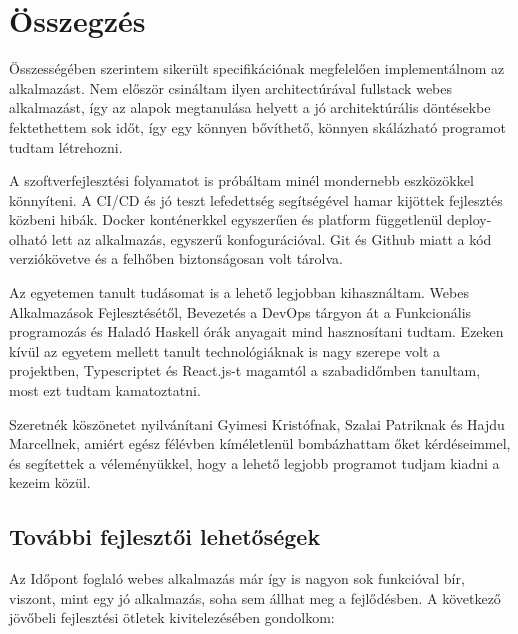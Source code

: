 \chapter{Összegzés} %
\label{ch:sum}

Összességében szerintem sikerült specifikációnak megfelelően implementálnom az alkalmazást. Nem először csináltam ilyen architectúrával fullstack webes alkalmazást, így az alapok megtanulása helyett a jó architektúrális döntésekbe fektethettem sok időt, így egy könnyen bővíthető, könnyen skálázható programot tudtam létrehozni.

A szoftverfejlesztési folyamatot is próbáltam minél mondernebb eszközökkel könnyíteni. A CI/CD és jó teszt lefedettség segítségével hamar kijöttek fejlesztés közbeni hibák. Docker konténerkkel egyszerűen és platform függetlenül deploy-olható lett az alkalmazás, egyszerű konfogurációval. Git és Github miatt a kód verziókövetve és a felhőben biztonságosan volt tárolva.

Az egyetemen tanult tudásomat is a lehető legjobban kihasználtam. Webes Alkalmazások Fejlesztésétől, Bevezetés a DevOps tárgyon át a Funkcionális programozás és Haladó Haskell órák anyagait mind hasznosítani tudtam. Ezeken kívül az egyetem mellett tanult technológiáknak is nagy szerepe volt a projektben, Typescriptet és React.js-t magamtól a szabadidőmben tanultam, most ezt tudtam kamatoztatni.

Szeretnék köszönetet nyilvánítani Gyimesi Kristófnak, Szalai Patriknak és Hajdu Marcellnek, amiért egész félévben kíméletlenül bombázhattam őket kérdéseimmel, és segítettek a véleményükkel, hogy a lehető legjobb programot tudjam kiadni a kezeim közül.

\clearpage

\section{További fejlesztői lehetőségek}
Az Időpont foglaló webes alkalmazás már így is nagyon sok funkcióval bír, viszont, mint egy jó alkalmazás, soha sem állhat meg a fejlődésben. A következő jövőbeli fejlesztési ötletek kivitelezésében gondolkom:

